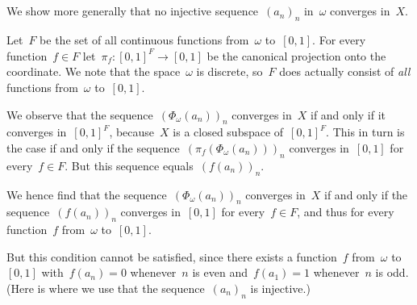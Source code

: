 \subsection{}

We show more generally that no injective sequence~$(a_n)_n$ in~$ω$ converges in~$X$.

Let~$F$ be the set of all continuous functions from~$ω$ to~$[0, 1]$.
For every function~$f ∈ F$ let~$π_f \colon [0, 1]^F \to [0, 1]$ be the canonical projection onto the~ coordinate.
We note that the space~$ω$ is discrete, so~$F$ does actually consist of \emph{all} functions from~$ω$ to~$[0, 1]$.

We observe that the sequence~$(Φ_ω(a_n))_n$ converges in~$X$ if and only if it converges in~$[0, 1]^F$, because~$X$ is a closed subspace of~$[0, 1]^F$.
This in turn is the case if and only if the sequence~$(π_f(Φ_ω(a_n)))_n$ converges in~$[0, 1]$ for every~$f ∈ F$.
But this sequence equals~$(f(a_n))_n$.

We hence find that the sequence~$(Φ_ω(a_n))_n$ converges in~$X$ if and only if the sequence~$(f(a_n))_n$ converges in~$[0, 1]$ for every~$f ∈ F$, and thus for every function~$f$ from~$ω$ to~$[0, 1]$.

But this condition cannot be satisfied, since there exists a function~$f$ from~$ω$ to~$[0, 1]$ with~$f(a_n) = 0$ whenever~$n$ is even and~$f(a_1) = 1$ whenever~$n$ is odd.
(Here is where we use that the sequence~$(a_n)_n$ is injective.)
